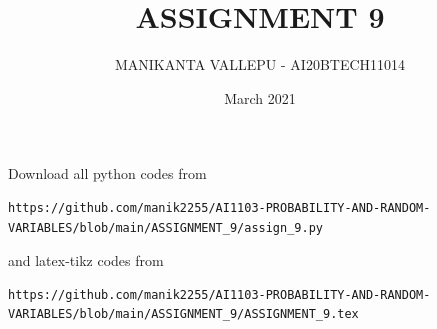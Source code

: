 \documentclass[journal,12pt,twocolumn]{IEEEtran}
\date{March 2021}
\DeclareMathOperator*{\Res}{Res}
\begin{document}
\newcommand{\BEQA}{\begin{eqnarray}}
\newcommand{\EEQA}{\end{eqnarray}}
\newcommand{\define}{\stackrel{\triangle}{=}}

\raggedbottom
\setlength{\parindent}{0pt}
\providecommand{\mbf}{\mathbf}
\providecommand{\pr}[1]{\ensuremath{\Pr\left(#1\right)}}
\providecommand{\qfunc}[1]{\ensuremath{Q\left(#1\right)}}
\providecommand{\fn}[1]{\ensuremath{f\left(#1\right)}}
\providecommand{\e}[1]{\ensuremath{E\left(#1\right)}}
\providecommand{\sbrak}[1]{\ensuremath{{}\left[#1\right]}}
\providecommand{\lsbrak}[1]{\ensuremath{{}\left[#1\right.}}
\providecommand{\rsbrak}[1]{\ensuremath{{}\left.#1\right]}}
\providecommand{\brak}[1]{\ensuremath{\left(#1\right)}}
\providecommand{\lbrak}[1]{\ensuremath{\left(#1\right.}}
\providecommand{\rbrak}[1]{\ensuremath{\left.#1\right)}}
\providecommand{\cbrak}[1]{\ensuremath{\left\{#1\right\}}}
\providecommand{\lcbrak}[1]{\ensuremath{\left\{#1\right.}}
\providecommand{\rcbrak}[1]{\ensuremath{\left.#1\right\}}}
\theoremstyle{remark}
\newtheorem{rem}{Remark}
\newcommand{\sgn}{\mathop{\mathrm{sgn}}}
\providecommand{\abs}[1]{\vert#1\vert}
\providecommand{\res}[1]{\Res\displaylimits_{#1}} 
\providecommand{\norm}[1]{\lVert#1\rVert}
\providecommand{\mtx}[1]{\mathbf{#1}}
\providecommand{\mean}[1]{E[ #1 ]}
\providecommand{\fourier}{\overset{\mathcal{F}}{ \rightleftharpoons}}
\providecommand{\system}{\overset{\mathcal{H}}{ \longleftrightarrow}}
\newcommand{\solution}{\noindent \textbf{Solution: }}
\newcommand{\cosec}{\,\text{cosec}\,}
\providecommand{\dec}[2]{\ensuremath{\overset{#1}{\underset{#2}{\gtrless}}}}
\newcommand{\myvec}[1]{\ensuremath{\begin{pmatrix}#1\end{pmatrix}}}
\newcommand{\mydet}[1]{\ensuremath{\begin{vmatrix}#1\end{vmatrix}}}
\makeatletter
\vspace{3cm}
\title{ASSIGNMENT 9}
\author{MANIKANTA VALLEPU - AI20BTECH11014}
\maketitle
\newpage
\bigskip
\renewcommand{\thetable}{\theenumi}
Download all python codes from 
\begin{lstlisting}
https://github.com/manik2255/AI1103-PROBABILITY-AND-RANDOM-VARIABLES/blob/main/ASSIGNMENT_9/assign_9.py
\end{lstlisting}
%
and latex-tikz codes from 
%
\begin{lstlisting}
https://github.com/manik2255/AI1103-PROBABILITY-AND-RANDOM-VARIABLES/blob/main/ASSIGNMENT_9/ASSIGNMENT_9.tex
\end{lstlisting}
\end{document}
